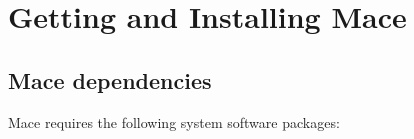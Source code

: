% 
% 
% 
% 
% 
% 
\section{Getting and Installing Mace}
\label{sec:installing}

\subsection{Mace dependencies}

Mace requires the following system software packages:

